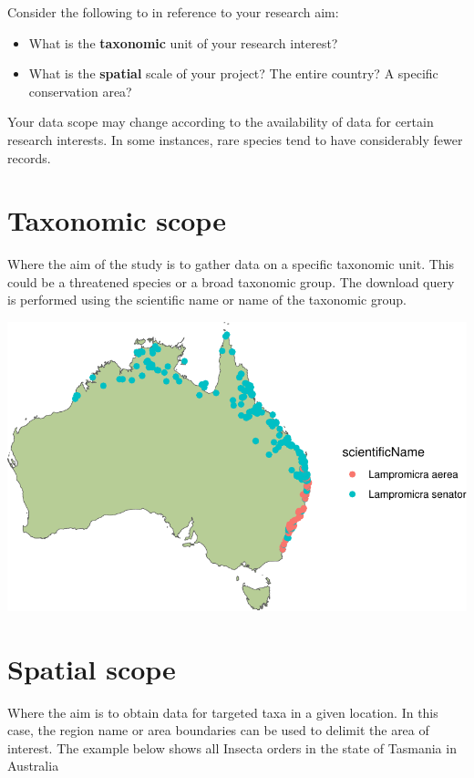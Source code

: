 \documentclass[
  letterpaper,
  DIV=11,
  numbers=noendperiod,
  oneside]{scrreprt}
\providecommand{\tightlist}{%
  \setlength{\itemsep}{0pt}\setlength{\parskip}{0pt}}\usepackage{longtable,booktabs,array}
\begin{document}
Consider the following to in reference to your research aim:

\begin{itemize}
\tightlist
\item
  What is the \textbf{taxonomic} unit of your research interest?
\item
  What is the \textbf{spatial} scale of your project? The entire
  country? A specific conservation area?
\end{itemize}

Your data scope may change according to the availability of data for
certain research interests. In some instances, rare species tend to have
considerably fewer records.

\hypertarget{taxonomic-scope}{%
\section{Taxonomic scope}\label{taxonomic-scope}}

Where the aim of the study is to gather data on a specific taxonomic
unit. This could be a threatened species or a broad taxonomic group. The
download query is performed using the scientific name or name of the
taxonomic group.

\includegraphics{./scope_files/figure-pdf/unnamed-chunk-1-1.pdf}

\hypertarget{spatial-scope}{%
\section{Spatial scope}\label{spatial-scope}}

Where the aim is to obtain data for targeted taxa in a given location.
In this case, the region name or area boundaries can be used to delimit
the area of interest. The example below shows all Insecta orders in the
state of Tasmania in Australia
\end{document}

